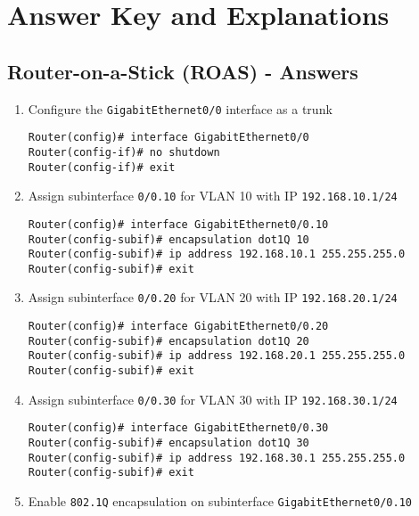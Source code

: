 \documentclass[a4paper]{book}
\begin{document}
\part{Answer Key and Explanations}


\chapter{Router-on-a-Stick (ROAS) - Answers}

\begin{enumerate}
\item{Configure the \texttt{GigabitEthernet0/0} interface as a trunk}

\begin{lstlisting}
Router(config)# interface GigabitEthernet0/0
Router(config-if)# no shutdown
Router(config-if)# exit
\end{lstlisting}

\item{Assign subinterface \texttt{0/0.10} for VLAN 10 with IP \texttt{192.168.10.1/24}}

\begin{lstlisting}
Router(config)# interface GigabitEthernet0/0.10
Router(config-subif)# encapsulation dot1Q 10
Router(config-subif)# ip address 192.168.10.1 255.255.255.0
Router(config-subif)# exit
\end{lstlisting}

\item{Assign subinterface \texttt{0/0.20} for VLAN 20 with IP \texttt{192.168.20.1/24}}

\begin{lstlisting}
Router(config)# interface GigabitEthernet0/0.20
Router(config-subif)# encapsulation dot1Q 20
Router(config-subif)# ip address 192.168.20.1 255.255.255.0
Router(config-subif)# exit
\end{lstlisting}

\item{Assign subinterface \texttt{0/0.30} for VLAN 30 with IP \texttt{192.168.30.1/24}}

\begin{lstlisting}
Router(config)# interface GigabitEthernet0/0.30
Router(config-subif)# encapsulation dot1Q 30
Router(config-subif)# ip address 192.168.30.1 255.255.255.0
Router(config-subif)# exit
\end{lstlisting}

\item{Enable \texttt{802.1Q} encapsulation on subinterface \texttt{GigabitEthernet0/0.10}}


\end{enumerate}
\end{document}
